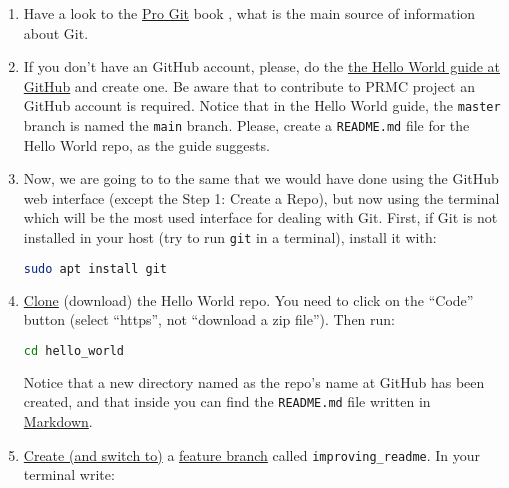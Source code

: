 \begin{enumerate}
  
\item Have a look to the \href{https://git-scm.com/book/en/v2}{Pro Git} 
  book \cite{Git-book}, what is the main source of information about
  Git.

\item If you don't have an GitHub account, please, do the
  \href{https://guides.github.com/activities/hello-world/}{the Hello
    World guide at GitHub} and create one. Be aware that to contribute
  to PRMC project an GitHub account is required. Notice that in the Hello
  World guide, the \texttt{master} branch is named the \texttt{main}
  branch. Please, create a \texttt{README.md} file for the Hello World
  repo, as the guide suggests.

\item Now, we are going to to the same that we would have done using
  the GitHub web interface (except the Step 1: Create a Repo), but now
  using the terminal which will be the most used interface for dealing
  with Git. First, if Git is not installed in your host (try to run
  \texttt{git} in a terminal), install it with:

  \begin{lstlisting}[language=bash]
    sudo apt install git
  \end{lstlisting}

\item
  \href{https://docs.github.com/en/github/getting-started-with-github/github-glossary#clone}{Clone}
  (download) the Hello World repo. You need to click on the ``Code''
  button (select ``https'', not ``download a
  zip file''). Then run:

  \begin{lstlisting}[language=bash]
    cd hello_world
  \end{lstlisting}

  Notice that a new directory named as the repo's name at GitHub has
  been created, and that inside you can find the \texttt{README.md}
  file written in
  \href{https://daringfireball.net/projects/markdown/}{Markdown}.

\item \href{https://docs.github.com/en/github/getting-started-with-github/github-glossary#checkout}{Create (and switch to)} a
  \href{https://docs.github.com/en/github/getting-started-with-github/github-glossary#feature-branch}{feature
    branch} called \texttt{improving\_readme}. In your terminal write:
  

\end{enumerate}
